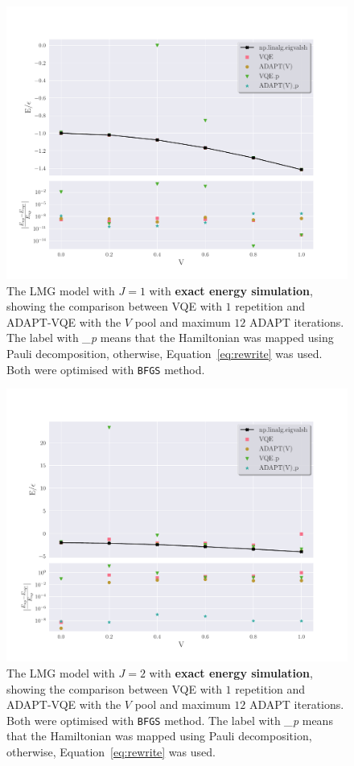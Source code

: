 \begin{figure}[ht]
	\centering
	\includegraphics[width=\linewidth]{image/lipkin_result/j1main_False.pdf}
	\caption{The LMG model with $ J=1 $ with \textbf{exact energy simulation}, showing the comparison between VQE with $ 1 $ repetition and ADAPT-VQE with the $ V $  pool and maximum $ 12 $ ADAPT iterations. The label with \textit{\_p} means that the Hamiltonian was mapped using Pauli decomposition, otherwise, Equation~\eqref{eq:rewrite} was used. Both were optimised with \texttt{BFGS} method.}
	\label{fig:j1main-nsn}
\end{figure}

\begin{figure}[ht]
	\centering
	\includegraphics[width=\linewidth]{image/j2main_False.pdf}
	\caption{The LMG model with $ J=2 $ with \textbf{exact energy simulation}, showing the comparison between VQE with $ 1 $ repetition and ADAPT-VQE with the $ V $  pool and maximum $ 12 $ ADAPT iterations. Both were optimised with \texttt{BFGS} method. The label with \textit{\_p} means that the Hamiltonian was mapped using Pauli decomposition, otherwise, Equation~\eqref{eq:rewrite} was used.}
	\label{fig:j2main-nsn}
\end{figure}


